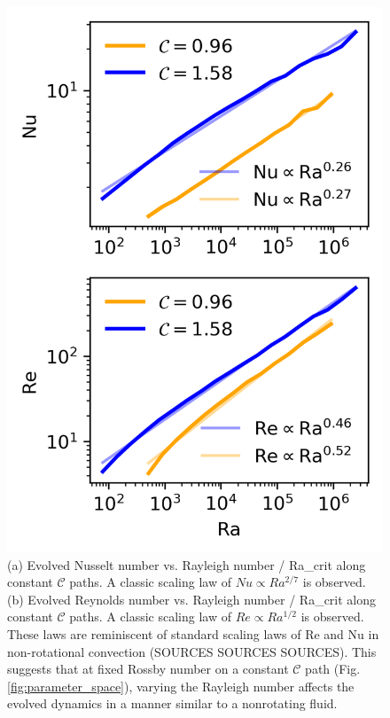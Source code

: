 \documentclass[twocolumn, amsmath, amsfonts, amssymb]{aastex62}
\begin{document}
\begin{figure}[h]
\includegraphics{./figs/nu_and_re.png}
\caption{(a) Evolved Nusselt number vs. Rayleigh number / Ra\_crit along constant
$\mathcal{C}$ paths. A classic scaling law of $Nu \propto Ra^{2/7}$ is observed.
(b) Evolved Reynolds number vs. Rayleigh number / Ra\_crit along constant $\mathcal{C}$ paths.
A classic scaling law of $Re \propto Ra^{1/2}$ is observed. These laws are
reminiscent of standard scaling laws of Re and Nu in non-rotational convection
(SOURCES SOURCES SOURCES). This suggests that at fixed Rossby number on
a constant $\mathcal{C}$ path (Fig. \ref{fig:parameter_space}), varying the Rayleigh
number affects the evolved dynamics in a manner similar to a nonrotating fluid.
\label{fig:nu_and_re} }
\end{figure}
\end{document}
